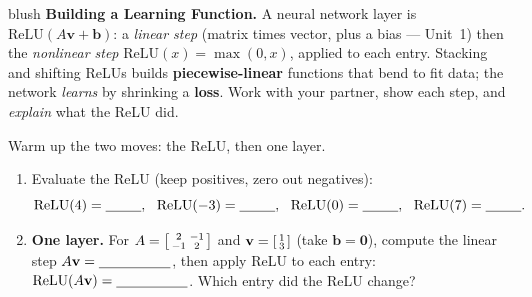 \documentclass[10pt]{article}
\newcommand{\vv}{\mathbf{v}}
\newcommand{\bb}{\mathbf{b}}
\newcommand{\zero}{\mathbf{0}}
\newcommand{\relu}{\mathrm{ReLU}}
\begin{document}
\namepartnerperiod

\vspace{0.10in}

\begin{headlinebox}{blush}
\small\textbf{Building a Learning Function.} A neural network layer is $\relu(A\vv+\bb)$: a
\emph{linear step} (matrix times vector, plus a bias --- Unit~1) then the \emph{nonlinear step}
$\relu(x)=\max(0,x)$, applied to each entry. Stacking and shifting ReLUs builds \textbf{piecewise-linear}
functions that bend to fit data; the network \emph{learns} by shrinking a \textbf{loss}. Work with your
partner, show each step, and \emph{explain} what the ReLU did.
\end{headlinebox}

\vspace{0.10in}

\begin{tcolorbox}[colback=white, colframe=black!40, title=\textbf{Tier R --- Remediate},
    fonttitle=\bfseries, arc=1.5mm, left=3mm, right=3mm, top=2mm, bottom=2mm, breakable]
Warm up the two moves: the ReLU, then one layer.
\begin{enumerate}[leftmargin=1.7em, itemsep=8pt]
  \item Evaluate the ReLU (keep positives, zero out negatives):
        \[ \relu(4)=\blank{0.9cm},\ \ \relu(-3)=\blank{0.9cm},\ \ \relu(0)=\blank{0.9cm},\ \ \relu(7)=\blank{0.9cm}. \]
  \item \textbf{One layer.} For $A=\begin{bsmallmatrix} 2 & -1\\ -1 & 2 \end{bsmallmatrix}$ and
        $\vv=\begin{bsmallmatrix} 1\\ 3 \end{bsmallmatrix}$ (take $\bb=\zero$), compute the linear step
        $A\vv=\blank{1.8cm}$, then apply ReLU to each entry: $\relu(A\vv)=\blank{1.8cm}$. Which entry did
        the ReLU change? \writeline
\end{enumerate}
\end{tcolorbox}
\end{document}
